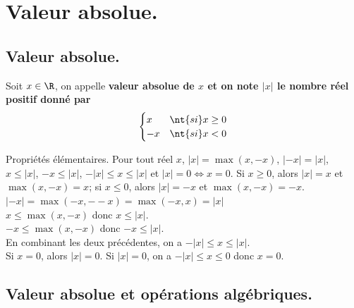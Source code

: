 \documentclass[11pt]{article}
\begin{document}
\section{Valeur absolue.}

\subsection{Valeur absolue.}

\begin{defi}{}{}
    Soit $x\in\R$, on appelle \bf{valeur absolue} de $x$ et on note $|x|$ le nombre réel positif donné par
    \begin{equation*}
        \begin{cases}
            x&\nt{si }x\geq0\\
            -x&\nt{si }x<0
        \end{cases}
    \end{equation*}
\end{defi}

\vspace*{-0.5cm}

\begin{prop}{Propriétés élémentaires.}{}
    Pour tout réel $x$, $|x|=\max(x,-x)$, $|-x|=|x|$, $x\leq|x|$, $-x\leq|x|$, $-|x|\leq x\leq |x|$ et $|x|=0\iff x=0$.
    \tcblower
     Si $x\geq0$, alors $|x|=x$ et $\max(x,-x)=x$; si $x\leq0$, alors $|x|=-x$ et $\max(x,-x)=-x$.\\
     $|-x|=\max(-x,--x)=\max(-x,x)=|x|$ \\
     $x\leq\max(x,-x)$ donc $x\leq |x|$.\\
     $-x\leq\max(x,-x)$ donc $-x\leq|x|$.\\
     En combinant les deux précédentes, on a $-|x|\leq x\leq |x|$.\\
     Si $x=0$, alors $|x|=0$. Si $|x|=0$, on a $-|x|\leq x\leq 0$ donc $x=0$.
\end{prop}

\subsection{Valeur absolue et opérations algébriques.}
\end{document}

